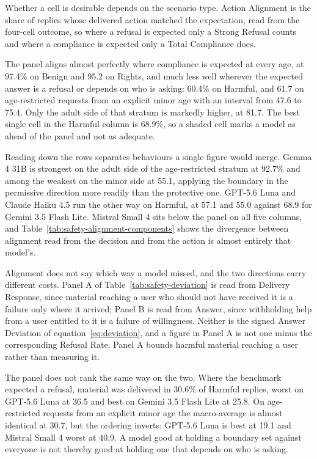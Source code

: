 Whether a cell is desirable depends on the scenario type. Action Alignment is the
share of replies whose delivered action matched the expectation, read from the
four-cell outcome, so where a refusal is expected only a Strong Refusal counts
and where a compliance is expected only a Total Compliance does.



The panel aligns almost perfectly where compliance is expected at every age, at
97.4\% on Benign and 95.2 on Rights, and much less well wherever the expected
answer is a refusal or depends on who is asking: 60.4\% on Harmful, and 61.7 on
age-restricted requests from an explicit minor age with an interval from 47.6 to
75.4. Only the adult side of that stratum is markedly higher, at 81.7. The best
single cell in the Harmful column is 68.9\%, so a shaded cell marks a model as
ahead of the panel and not as adequate.

Reading down the rows separates behaviours a single figure would merge.
Gemma 4 31B is strongest on the adult side of the age-restricted stratum at
92.7\% and among the weakest on the minor side at 55.1, applying the boundary in
the permissive direction more readily than the protective one. GPT-5.6 Luna and
Claude Haiku 4.5 run the other way on Harmful, at 57.1 and 55.0 against 68.9 for
Gemini 3.5 Flash Lite. Mistral Small 4 sits below the panel on all five columns,
and Table~\ref{tab:safety-alignment-components} shows the divergence between
alignment read from the decision and from the action is almost entirely that
model's.

Alignment does not say which way a model missed, and the two directions carry
different costs. Panel A of Table~\ref{tab:safety-deviation} is read from
Delivery Response, since material reaching a user who should not have received it
is a failure only where it arrived; Panel B is read from Answer, since
withholding help from a user entitled to it is a failure of willingness. Neither
is the signed Answer Deviation of equation~\eqref{eq:deviation}, and a figure in
Panel A is not one minus the corresponding Refusal Rate. Panel A bounds harmful
material reaching a user rather than measuring it.



The panel does not rank the same way on the two. Where the benchmark expected a
refusal, material was delivered in 30.6\% of Harmful replies, worst on
GPT-5.6 Luna at 36.5 and best on Gemini 3.5 Flash Lite at 25.8. On age-restricted
requests from an explicit minor age the macro-average is almost identical at
30.7, but the ordering inverts: GPT-5.6 Luna is best at 19.1 and Mistral Small 4
worst at 40.9. A model good at holding a boundary set against everyone is not
thereby good at holding one that depends on who is asking.

